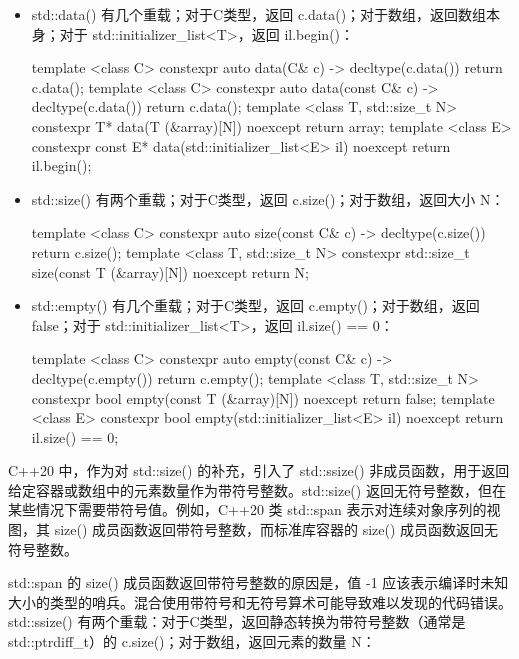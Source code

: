 \begin{itemize}
\item
std::data() 有几个重载；对于C类型，返回 c.data()；对于数组，返回数组本身；对于 std::initializer\_list<T>，返回 il.begin()：

\begin{cpp}
template <class C>
constexpr auto data(C& c) -> decltype(c.data())
{
    return c.data();
}
template <class C>
constexpr auto data(const C& c) -> decltype(c.data())
{
    return c.data();
}
template <class T, std::size_t N>
constexpr T* data(T (&array)[N]) noexcept
{
    return array;
}
template <class E>
constexpr const E* data(std::initializer_list<E> il) noexcept
{
    return il.begin();
}
\end{cpp}

\item
std::size() 有两个重载；对于C类型，返回 c.size()；对于数组，返回大小 N：

\begin{cpp}
template <class C>
constexpr auto size(const C& c) -> decltype(c.size())
{
    return c.size();
}
template <class T, std::size_t N>
constexpr std::size_t size(const T (&array)[N]) noexcept
{
    return N;
}
\end{cpp}

\item
std::empty() 有几个重载；对于C类型，返回 c.empty()；对于数组，返回 false；对于 std::initializer\_list<T>，返回 il.size() == 0：

\begin{cpp}
template <class C>
constexpr auto empty(const C& c) -> decltype(c.empty())
{
    return c.empty();
}
template <class T, std::size_t N>
constexpr bool empty(const T (&array)[N]) noexcept
{
    return false;
}
template <class E>
constexpr bool empty(std::initializer_list<E> il) noexcept
{
    return il.size() == 0;
}
\end{cpp}
\end{itemize}

C++20 中，作为对 std::size() 的补充，引入了 std::ssize() 非成员函数，用于返回给定容器或数组中的元素数量作为带符号整数。std::size() 返回无符号整数，但在某些情况下需要带符号值。例如，C++20 类 std::span 表示对连续对象序列的视图，其 size() 成员函数返回带符号整数，而标准库容器的 size() 成员函数返回无符号整数。

std::span 的 size() 成员函数返回带符号整数的原因是，值 -1 应该表示编译时未知大小的类型的哨兵。混合使用带符号和无符号算术可能导致难以发现的代码错误。std::ssize() 有两个重载：对于C类型，返回静态转换为带符号整数（通常是 std::ptrdiff\_t）的 c.size()；对于数组，返回元素的数量 N：

